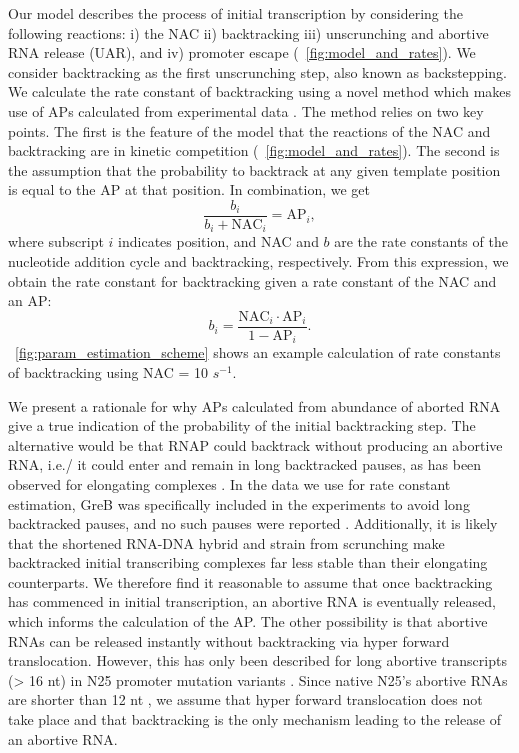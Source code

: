 %
Our model describes the process of initial transcription by considering the
following reactions: i) the NAC ii) backtracking iii) unscrunching and abortive
RNA release (UAR), and iv) promoter escape (\FIG~\ref{fig:model_and_rates}).
We consider backtracking as the first unscrunching step, also known as
backstepping. We calculate the rate constant of backtracking using a novel
method which makes use of APs calculated from experimental data
\cite{hsu_quantitative_1996}. The method relies on two key points. The first
is the feature of the model that the reactions of the NAC and backtracking are in
kinetic competition (\FIG~\ref{fig:model_and_rates}). The second is the
assumption that the probability to backtrack at any given template position is
equal to the AP at that position. In combination, we get
\begin{equation*}
    \frac{b_i}{b_i + \text{NAC}_i} = \text{AP}_i,
\end{equation*}
where subscript $i$ indicates position, and NAC and $b$ are the rate constants
of the nucleotide addition cycle and backtracking, respectively. From this
expression, we obtain the rate constant for backtracking given a rate constant
of the NAC and an AP:
\begin{equation}
  b_i = \frac{\text{NAC}_i\cdot\text{AP}_i}{1-\text{AP}_i}.
  \label{eq:backtrackingcalc}
\end{equation}
\FIG~\ref{fig:param_estimation_scheme} shows an example calculation of rate
constants of backtracking using NAC = 10 $s^{-1}$.

We present a rationale for why APs calculated from abundance of aborted RNA
give a true indication of the probability of the initial backtracking step.
The alternative would be that RNAP could backtrack without producing an
abortive RNA, i.e./ it could enter and remain in long backtracked pauses, as
has been observed for elongating complexes \cite{shaevitz_backtracking_2003}.
In the data we use for rate constant estimation, GreB was specifically
included in the experiments to avoid long backtracked pauses, and no such
pauses were reported \cite{revyakin_abortive_2006}. Additionally, it is likely
that the shortened RNA-DNA hybrid and strain from scrunching make backtracked
initial transcribing complexes far less stable than their elongating
counterparts. We therefore find it reasonable to assume that once backtracking
has commenced in initial transcription, an abortive RNA is eventually
released, which informs the calculation of the AP. The other possibility is
that abortive RNAs can be released instantly without backtracking via
hyper forward translocation. However, this has only been described for long
abortive transcripts (> 16 nt) in N25 promoter mutation variants
\cite{chander_alternate_2007, chander_mechanisms_2015}. Since native N25's
abortive RNAs are shorter than 12 nt \cite{chander_alternate_2007}, we assume
that hyper forward translocation does not take place and that backtracking is
the only mechanism leading to the release of an abortive RNA.


